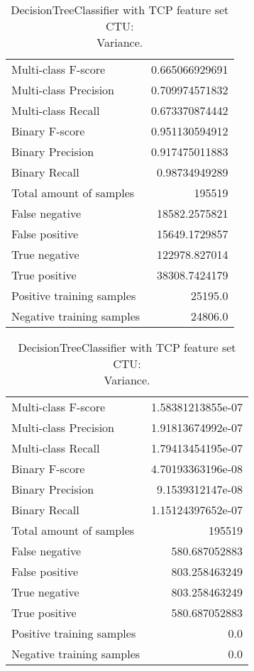 \begin{table}[H]
\begin{minipage}{0.5\textwidth}
\caption{DecisionTreeClassifier with TCP feature set CTU: \\Average.}
\centering
\begin{tabular}{l r}
\toprule
Multi-class F-score & 0.665066929691 \\
Multi-class Precision & 0.709974571832 \\
Multi-class Recall & 0.673370874442 \\
\midrule
Binary F-score & 0.951130594912 \\
Binary Precision & 0.917475011883 \\
Binary Recall & 0.98734949289 \\
\midrule
Total amount of samples & 195519 \\
False negative & 18582.2575821 \\
False positive & 15649.1729857 \\
True negative & 122978.827014 \\
True positive & 38308.7424179 \\
\midrule
Positive training samples & 25195.0 \\
Negative training samples & 24806.0 \\
\bottomrule
\end{tabular}
\end{minipage}
\hfillx
\begin{minipage}{0.5\textwidth}
\caption{DecisionTreeClassifier with TCP feature set CTU: \\Variance.}
\centering
\begin{tabular}{l r}
\toprule
Multi-class F-score & 1.58381213855e-07 \\
Multi-class Precision & 1.91813674992e-07 \\
Multi-class Recall & 1.79413454195e-07 \\
\midrule
Binary F-score & 4.70193363196e-08 \\
Binary Precision & 9.1539312147e-08 \\
Binary Recall & 1.15124397652e-07 \\
\midrule
Total amount of samples & 195519 \\
False negative & 580.687052883 \\
False positive & 803.258463249 \\
True negative & 803.258463249 \\
True positive & 580.687052883 \\
\midrule
Positive training samples & 0.0 \\
Negative training samples & 0.0 \\
\bottomrule
\end{tabular}
\end{minipage}
\end{table}


